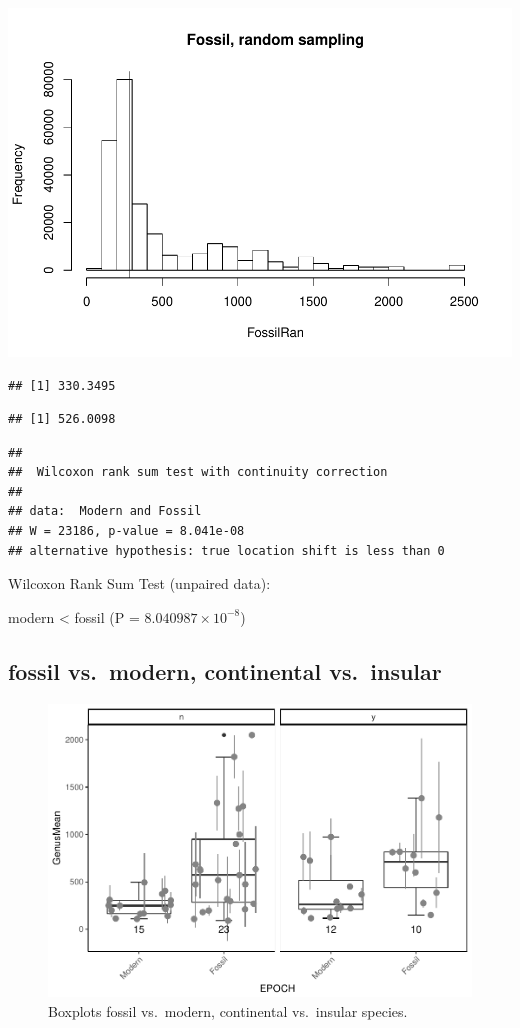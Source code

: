 \documentclass[]{article}
\begin{document}
\includegraphics{MA_JJ_files/figure-latex/RSFM-1.pdf}

\begin{verbatim}
## [1] 330.3495
\end{verbatim}

\begin{verbatim}
## [1] 526.0098
\end{verbatim}

\begin{verbatim}
## 
##  Wilcoxon rank sum test with continuity correction
## 
## data:  Modern and Fossil
## W = 23186, p-value = 8.041e-08
## alternative hypothesis: true location shift is less than 0
\end{verbatim}

Wilcoxon Rank Sum Test (unpaired data):

modern \textless{} fossil (P = \(8.040987\times 10^{-8}\))

\newpage

\subsection{fossil vs.~modern, continental
vs.~insular}\label{fossil-vs.modern-continental-vs.insular}

\begin{figure}[htbp]
\centering
\includegraphics{MA_JJ_files/figure-latex/BPFMCI-1.pdf}
\caption{Boxplots fossil vs.~modern, continental vs.~insular species.}
\end{figure}
\end{document}
